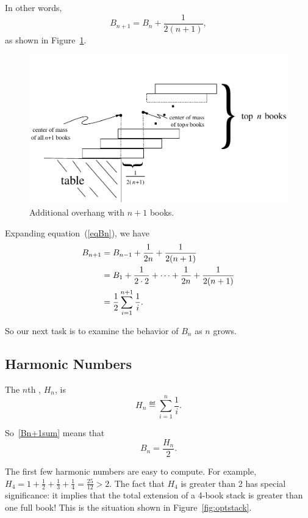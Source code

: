 In other words, 
\begin{equation}\label{eqBn}
    B_{n+1} = B_n + \frac{1}{2(n+1)},
\end{equation}
as shown in Figure~\ref{Bn1}.

\begin{figure}
\centerline{\includegraphics[width=.80\textwidth]{figures/drafts/bookstack-5}}
\caption{Additional overhang with $n+1$ books.}
\label{Bn1}
\end{figure}

Expanding equation~(\ref{eqBn}), we have
\begin{align}
B_{n+1} & = B_{n-1} + \frac{1}{2n} + \frac{1}{2(n+1)}\notag\\
        & = B_1 + \frac{1}{2 \cdot 2} + \cdots + \frac{1}{2n} +
            \frac{1}{2(n+1)}\notag\\
        & = \frac{1}{2}\sum_{i=1}^{n+1} \frac{1}{i}.\label{Bn+1sum}
\end{align}

So our next task is to examine the behavior of $B_n$ as $n$ grows.

\subsection{Harmonic Numbers}

\begin{definition}
The $n$th , $H_n$, is
\[
H_n \eqdef \sum_{i=1}^n \frac{1}{i}.
\]
\end{definition}
So~\eqref{Bn+1sum} means that
\[
B_n = \frac{H_n}{2}.
\]

The first few harmonic numbers are easy to compute.  For example, $H_4 = 1
+ \frac{1}{2} + \frac{1}{3} + \frac{1}{4} = \frac{25}{12} > 2$.  The fact that
$H_4$ is greater than 2 has special significance: it implies that the
total extension of a 4-book stack is greater than one full book!  This is
the situation shown in Figure~\ref{fig:optstack}.

